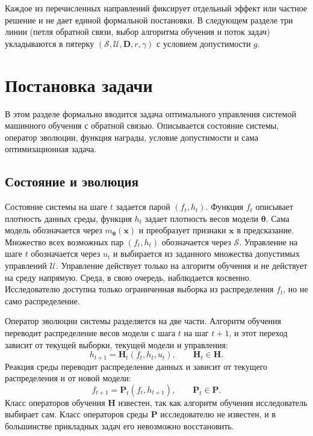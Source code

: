 \documentclass[a4paper,14pt,oneside,openany]{extarticle}
\newcommand{\bD}{\mathbf{D}}
\newcommand{\bH}{\mathbf{H}}
\newcommand{\bP}{\mathbf{P}}
\newcommand{\bx}{\mathbf{x}}
\newcommand{\cS}{\mathcal{S}}
\newcommand{\cU}{\mathcal{U}}
\newcommand{\btheta}{\boldsymbol{\theta}}
\begin{document}
Каждое из перечисленных направлений фиксирует отдельный эффект или частное решение и не дает единой формальной постановки. В следующем разделе три линии (петля обратной связи, выбор алгоритма обучения и поток задач) укладываются в пятерку $(\cS, \cU, \bD, r, \gamma)$ с условием допустимости $g$.

\newpage
\section{Постановка задачи}\label{sec:problem_statement}

В этом разделе формально вводится задача оптимального управления системой машинного обучения с обратной связью. Описывается состояние системы, оператор эволюции, функция награды, условие допустимости и сама оптимизационная задача.

\subsection{Состояние и эволюция}

Состояние системы на шаге $t$ задается парой $(f_t, h_t)$. Функция $f_t$ описывает плотность данных среды, функция $h_t$ задает плотность весов модели $\btheta$. Сама модель обозначается через $m_{\btheta}(\bx)$ и преобразует признаки $\bx$ в предсказание. Множество всех возможных пар $(f_t, h_t)$ обозначается через $\cS$. Управление на шаге $t$ обозначается через $u_t$ и выбирается из заданного множества допустимых управлений $\cU$. Управление действует только на алгоритм обучения и не действует на среду напрямую. Среда, в свою очередь, наблюдается косвенно. Исследователю доступна только ограниченная выборка из распределения $f_t$, но не само распределение.

Оператор эволюции системы разделяется на две части. Алгоритм обучения переводит распределение весов модели с шага $t$ на шаг $t + 1$, и этот переход зависит от текущей выборки, текущей модели и управления:
\begin{equation}
    h_{t+1} = \bH_t(f_t, h_t, u_t), \qquad \bH_t \in \bH. \label{eq:H_op}
\end{equation}
Реакция среды переводит распределение данных и зависит от текущего распределения и от новой модели:
\begin{equation}
    f_{t+1} = \bP_t(f_t, h_{t+1}), \qquad \bP_t \in \bP. \label{eq:P_op}
\end{equation}
Класс операторов обучения $\bH$ известен, так как алгоритм обучения исследователь выбирает сам. Класс операторов среды $\bP$ исследователю не известен, и в большинстве прикладных задач его невозможно восстановить.
\end{document}
